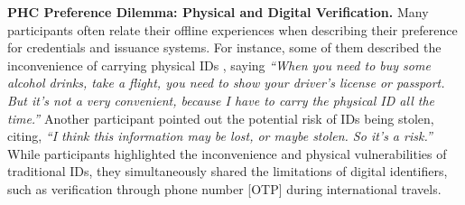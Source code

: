 
\textbf{PHC Preference Dilemma: Physical and Digital Verification.}
Many participants often relate their offline experiences when describing their preference for credentials and issuance systems.
For instance, some of them described the inconvenience of carrying physical IDs %
, saying \textit{``When you need to buy some alcohol drinks, take a flight, you need to show your driver's license or passport. %
But it's not a very convenient, because I have to carry the physical ID all the time.''} Another participant pointed out the potential risk of IDs being stolen, citing, \textit{``I think this information may be lost, or maybe stolen. So it's a risk.''} 
While participants highlighted the inconvenience and physical vulnerabilities of traditional IDs, they simultaneously shared the limitations of digital identifiers, such as verification through phone number [OTP] during international travels.


